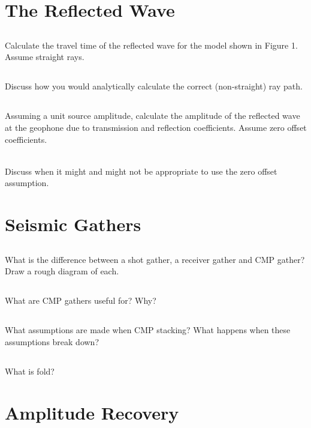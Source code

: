 \section{The Reflected Wave}
\subsection{}
Calculate the travel time of the reflected wave for the model shown in Figure 1. Assume straight rays.
\subsection{}
Discuss how you would analytically calculate the correct (non-straight) ray path.
\subsection{}
Assuming a unit source amplitude, calculate the amplitude of the reflected wave at the geophone due to transmission and reflection coefficients.  Assume zero offset coefficients.
\par~\\
Discuss when it might and might not be appropriate to use the zero offset assumption.

\section{Seismic Gathers}
\subsection{}
What is the difference between a shot gather, a receiver gather and  CMP gather? Draw a rough diagram of each.  
\subsection{}
What are CMP gathers useful for? Why?
\subsection{}
What assumptions are made when CMP stacking? What happens when these assumptions break down?
\subsection{}
What is fold?
\section{Amplitude Recovery}
